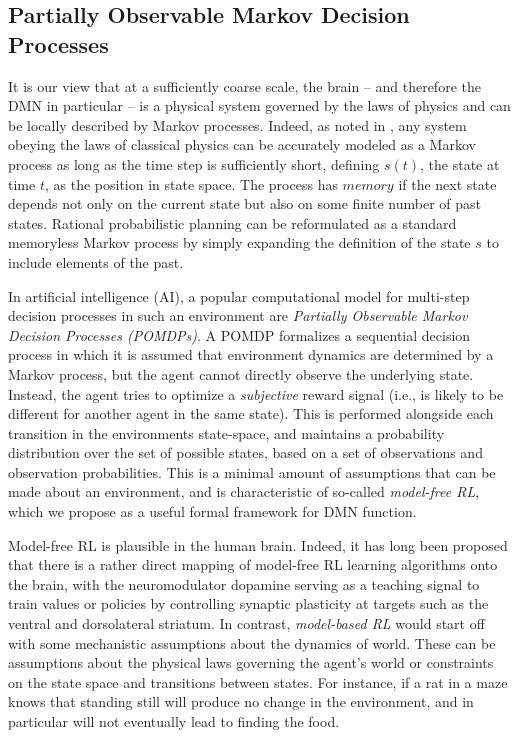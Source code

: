 \documentclass[10pt,letterpaper]{article}
\begin{document}
\subsection{Partially Observable Markov Decision Processes}
It is our view that at a sufficiently coarse scale, the brain -- and therefore the DMN in particular --
is a physical system governed by the laws of
physics and can be locally described by Markov processes. Indeed, as noted in \cite{tegmark2016improved},
any system obeying the laws of classical physics can be accurately modeled as a Markov process as long as the time
step is sufficiently short, defining $s(t)$, the state at time $t$, as the position in state space.
The process has $memory$ if the next state depends not only on the current state but also on some finite
number of past states.
Rational probabilistic planning can be reformulated
as a standard memoryless Markov process by simply expanding the
definition of the state $s$ to include elements of the past.

In artificial intelligence (AI), a popular computational model for
multi-step decision processes in such an environment are
\textit{Partially Observable Markov Decision Processes (POMDPs)}.
A POMDP formalizes a sequential decision process in which it is assumed that environment dynamics are determined by a Markov process,
but the agent cannot directly observe the underlying state.
Instead, the agent tries to optimize a \textit{subjective} reward
signal (i.e., is likely to be different for another agent in the same state).
This is performed alongside each transition in the environments state-space, and maintains a probability distribution over the set of possible
states, based on a set of observations and observation probabilities. This is a minimal amount of assumptions that can be made about an environment,
and is characteristic of so-called \textit{model-free RL},
which we propose as a useful formal framework for DMN function.

Model-free RL is plausible in the human brain. Indeed,
it has long been proposed \citep{dayan2008decision} that there
is a rather direct mapping of model-free RL learning algorithms
onto the brain,
with the neuromodulator dopamine serving
as a teaching signal to train values or policies by controlling
synaptic plasticity at targets such as the ventral and
dorsolateral striatum.
In contrast, \textit{model-based RL} would start off with some mechanistic assumptions about the dynamics of world.
These can be assumptions about the physical laws governing the agent's world or constraints on the state space and transitions between states.
For instance, if a rat in a maze knows
that standing still will produce no change in the environment, and in particular will not eventually lead to finding the food.
\end{document}
